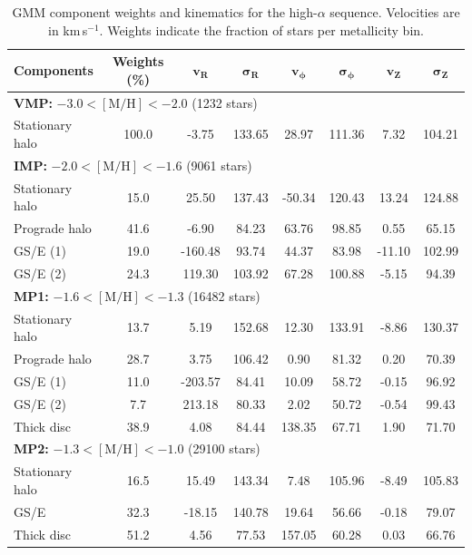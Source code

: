 \documentclass[a4paper,12pt]{article}
\begin{document}
\begin{table}
\centering
\begin{tabular}{lccccccc}
\hline
\textbf{Components} & \textbf{Weights (\%)} & $\mathbf{v_R}$ & $\boldsymbol{\sigma_R}$ & $\mathbf{v_\phi}$ & $\boldsymbol{\sigma_\phi}$ & $\mathbf{v_Z}$ & $\boldsymbol{\sigma_Z}$ \\
\hline
\multicolumn{8}{l}{\textbf{VMP:} $-3.0 < \mathrm{[M/H]} < -2.0$ (1232 stars)} \\
Stationary halo     & 100.0 &  -3.75 & 133.65 &  28.97  & 111.36 &  7.32  & 104.21 \\
\hline
\multicolumn{8}{l}{\textbf{IMP:} $-2.0 < \mathrm{[M/H]} < -1.6$ (9061 stars)} \\
Stationary halo     & 15.0  &  25.50 & 137.43 & -50.34  & 120.43 & 13.24  & 124.88 \\
Prograde halo       & 41.6  &  -6.90 &  84.23 &  63.76  &  98.85 &  0.55  &  65.15 \\
GS/E (1)            & 19.0  &-160.48 &  93.74 &  44.37  &  83.98 &-11.10  & 102.99 \\
GS/E (2)            & 24.3  & 119.30 & 103.92 &  67.28  & 100.88 & -5.15  &  94.39 \\
\hline
\multicolumn{8}{l}{\textbf{MP1:} $-1.6 < \mathrm{[M/H]} < -1.3$ (16482 stars)} \\
Stationary halo     & 13.7  &   5.19 & 152.68 &  12.30  & 133.91 & -8.86  & 130.37 \\
Prograde halo       & 28.7  &   3.75 & 106.42 &   0.90  &  81.32 &  0.20  &  70.39 \\
GS/E (1)            & 11.0  &-203.57 &  84.41 &  10.09  &  58.72 & -0.15  &  96.92 \\
GS/E (2)            &  7.7  & 213.18 &  80.33 &   2.02  &  50.72 & -0.54  &  99.43 \\
Thick disc          & 38.9  &   4.08 &  84.44 & 138.35  &  67.71 &  1.90  &  71.70 \\
\hline
\multicolumn{8}{l}{\textbf{MP2:} $-1.3 < \mathrm{[M/H]} < -1.0$ (29100 stars)} \\
Stationary halo     & 16.5  &  15.49 & 143.34 &   7.48  & 105.96 & -8.49  & 105.83 \\
GS/E                & 32.3  & -18.15 & 140.78 &  19.64  &  56.66 & -0.18  &  79.07 \\
Thick disc          & 51.2  &   4.56 &  77.53 & 157.05  &  60.28 &  0.03  &  66.76 \\
\hline
\end{tabular}
\caption{GMM component weights and kinematics for the high-$\alpha$ sequence.  
Velocities are in km\,s$^{-1}$. Weights indicate the fraction of stars per metallicity bin.}
\label{tab:gmm_higha_stats}
\end{table}
\end{document}
